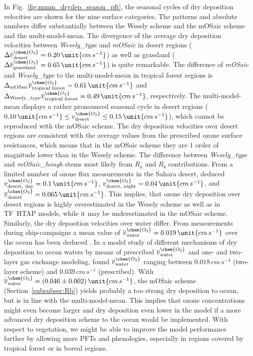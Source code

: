 \documentclass[gmd, manuscript]{copernicus}
\begin{document}
In Fig.~\ref{fig:mmm_drydep_season_pft}, the seasonal cycles of dry deposition velocities are shown for the nine surface categories. The patterns and absolute numbers differ substantially between the Wesely scheme and the mOSaic scheme and the multi-model-mean. The divergence of the average dry deposition velocities between \emph{Wesely\_type} and \emph{mOSaic} in desert regions ($\Delta \overline{v}_\text{desert}^\chem{O_3} = 0.20\,\unit{cm\,s^{-1}}$) as well as grassland ($\Delta \overline{v}_\text{grassland}^\chem{O_3} = 0.65\,\unit{cm\,s^{-1}}$) is quite remarkable. The difference of \emph{mOSaic} and \emph{Wesely\_type} to the multi-model-mean in tropical forest regions is $\Delta_\text{mOSaic} \overline{v}_\text{tropical forest}^\chem{O_3} = 0.61\,\unit{cm\,s^{-1}}$ and $\Delta_\text{Wesely\_type} \overline{v}_\text{tropical forest}^\chem{O_3} = 0.49\,\unit{cm\,s^{-1}}$, respectively. The multi-model-mean displays a rather pronounced seasonal cycle in desert regions ($0.10\,\unit{cm\,s^{-1}} \leq v^\chem{O_3}_\text{desert}\leq 0.15\,\unit{cm\,s^{-1}}$), which cannot be reproduced with the mOSaic scheme. The dry deposition velocities over desert regions are consistent with the average values from the prescribed ozone surface resistances, which means that in the mOSaic scheme they are $1$ order of magnitude lower than in the Wesely scheme. The difference between \emph{Wesely\_type} and \emph{mOSaic\_hough} stems most likely from $R_a$ and $R_b$ contributions. From a limited number of ozone flux measurements in the Sahara desert, \citet{AE:Gusten1995} deduced $v^\chem{O_3}_\text{desert, day} = 0.1\,\unit{cm\,s^{-1}}$, $v^\chem{O_3}_\text{desert, night} = 0.04\,\unit{cm\,s^{-1}}$, and $\overline{v}^\chem{O_3}_\text{desert} = 0.065\,\unit{cm\,s^{-1}}$. This implies, that ozone dry deposition over desert regions is highly overestimated in the Wesely scheme as well as in TF~HTAP models, while it may be underestimated in the mOSaic scheme. Similarly, the dry deposition velocities over water differ. From measurements during ship-campaigns a mean value of $\overline{v}^\chem{O_3}_\text{water} = 0.019\,\unit{cm\,s^{-1}}$ over the ocean has been deduced \citep{JGR:Helmig2012}. In a model study of different mechanisms of dry deposition to ocean waters by means of prescribed $\overline{v}_\text{water}^\chem{O_3}$ and one- and two-layer gas exchange modeling, \citet{ACP:Luhar2017} found $\overline{v}_\text{water}^\chem{O_3}$ ranging between $0.018\,\unit{cm\,s^{-1}}$ (two-layer scheme) and $0.039\,\unit{cm\,s^{-1}}$ (prescribed). With $\overline{v}^\chem{O_3}_\text{water} = (0.046\pm0.002)\,\unit{cm\,s^{-1}}$, the mOSaic scheme (Section~\ref{subsubsec:Rb}) yields probably a too strong dry deposition to ocean, but is in line with the multi-model-mean. This implies that ozone concentrations might even become larger and dry deposition even lower in the model if a more advanced dry deposition scheme to the ocean would be implemented. With respect to vegetation, we might be able to improve the model performance further by allowing more PFTs and phenologies, especially in regions covered by tropical forest \citep{GCB:Anav2017} or in boreal regions. 
\end{document}
